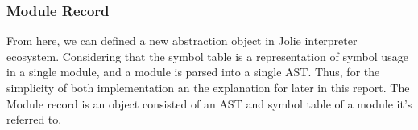 \subsubsection*{Module Record}

From here, we can defined a new abstraction object in Jolie interpreter ecosystem. Considering that the symbol table is a representation of symbol usage in a single module, and a module is parsed into a single AST. Thus, for the simplicity of both implementation an the explanation for later in this report. The Module record is an object consisted of an AST and symbol table of a module it's referred to.
